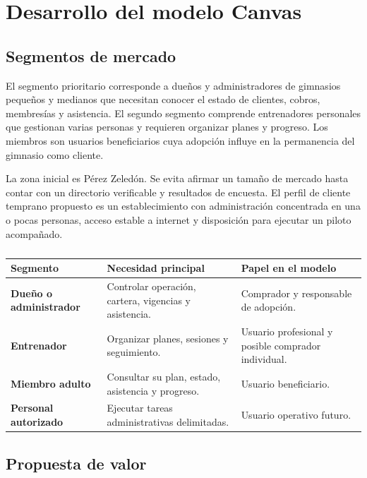 \section{Desarrollo del modelo Canvas}

\subsection{Segmentos de mercado}

El segmento prioritario corresponde a dueños y administradores de gimnasios
pequeños y medianos que necesitan conocer el estado de clientes, cobros,
membresías y asistencia. El segundo segmento comprende entrenadores personales
que gestionan varias personas y requieren organizar planes y progreso. Los
miembros son usuarios beneficiarios cuya adopción influye en la permanencia del
gimnasio como cliente.

La zona inicial es Pérez Zeledón. Se evita afirmar un tamaño de mercado hasta
contar con un directorio verificable y resultados de encuesta. El perfil de
cliente temprano propuesto es un establecimiento con administración concentrada
en una o pocas personas, acceso estable a internet y disposición para ejecutar
un piloto acompañado.

\begin{table}[H]
\caption{Segmentos y necesidades iniciales}
\begin{tabularx}{\textwidth}{>{\bfseries}p{3.3cm}X X}
\toprule
Segmento & Necesidad principal & Papel en el modelo \\
\midrule
Dueño o administrador & Controlar operación, cartera, vigencias y asistencia. & Comprador y responsable de adopción. \\
Entrenador & Organizar planes, sesiones y seguimiento. & Usuario profesional y posible comprador individual. \\
Miembro adulto & Consultar su plan, estado, asistencia y progreso. & Usuario beneficiario. \\
Personal autorizado & Ejecutar tareas administrativas delimitadas. & Usuario operativo futuro. \\
\bottomrule
\end{tabularx}
\caption*{\fuentepropia}
\end{table}

\subsection{Propuesta de valor}

